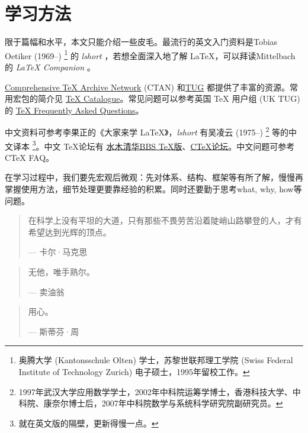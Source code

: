 \section{学习方法}

限于篇幅和水平，本文只能介绍一些皮毛。最流行的英文入门资料是Tobias Oetiker (1969--)\indexOetiker{} \footnote{奥腾大学 (Kantonsschule Olten) 学士，苏黎世联邦理工学院 (Swiss Federal Institute of Technology Zurich) 电子硕士，1995年留校工作。} 的 \emph{lshort} \citep{Oetiker_2008}，若想全面深入地了解 \LaTeX ，可以拜读Mittelbach的 \emph{\LaTeX{} Companion} \citep{Mittelbach_2004}。

\href{http://www.ctan.org/}{Comprehensive TeX Archive Network} (CTAN) 和\href{http://www.tug.org/}{TUG} 都提供了丰富的资源。常用宏包的简介见 \href{http://www.ctan.org/tex-archive/help/Catalogue/catalogue.html}{TeX Catalogue}。常见问题可以参考英国 TeX 用户组 (UK TUG) 的 \href{http://www.tex.ac.uk/faq/}{TeX Frequently Asked Questions}。

中文资料可参考李果正\indexLee 的《大家来学 \LaTeX 》\citep{Lee_2004}，\emph{lshort} 有吴凌云 (1975--)\indexWuLingyun{} \footnote{1997年武汉大学应用数学学士，2002年中科院运筹学博士，香港科技大学、中科院、康奈尔博士后，2007年中科院数学与系统科学研究院副研究员。} 等的中文译本 \footnote{就在英文版的隔壁，更新得慢一点。}。中文 \TeX 论坛有 \href{http://www.smth.org/bbsdoc.php?board=TeX}{水木清华BBS TeX版}、\href{http://bbs.ctex.org/}{CTeX论坛}。中文问题可参考 CTeX FAQ\citep{CTeX_FAQ}。

在学习过程中，我们要先宏观后微观：先对体系、结构、框架等有所了解，慢慢再掌握使用方法，细节处理更要靠经验的积累。同时还要勤于思考what, why, how等问题。

\begin{quotation}
在科学上没有平坦的大道，只有那些不畏劳苦沿着陡峭山路攀登的人，才有希望达到光辉的顶点。
\begin{flushright}
--- 卡尔·马克思
\end{flushright}
\end{quotation}

\begin{quotation}
无他，唯手熟尔。
\begin{flushright}
--- 卖油翁
\end{flushright}
\end{quotation}

\begin{quotation}
用心。
\begin{flushright}
--- 斯蒂芬·周
\end{flushright}
\end{quotation}



